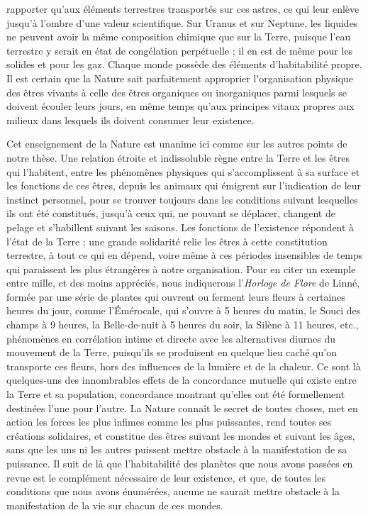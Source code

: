 \documentclass[a4paper, 11pt, oneside]{article}
\begin{document}
rapporter qu'aux éléments terrestres transportés sur ces astres, ce qui leur enlève jusqu'à l'ombre d'une valeur scientifique. Sur Uranus et sur Neptune, les liquides ne peuvent avoir la même composition chimique que sur la Terre, puisque l'eau terrestre y serait en état de congélation perpétuelle ; il en est de même pour les solides et pour les gaz. Chaque monde possède des éléments d'habitabilité propre. Il est certain que la Nature sait parfaitement approprier l'organisation physique des êtres vivants à celle des êtres organiques ou inorganiques parmi lesquels se doivent écouler leurs jours, en même temps qu'aux principes vitaux propres aux milieux dans lesquels ils doivent consumer leur existence.

Cet enseignement de la Nature est unanime ici comme sur les autres points de notre thèse. Une relation étroite et indissoluble règne entre la Terre et les êtres qui l'habitent, entre les phénomènes physiques qui s'accomplissent à sa surface et les fonctions de ces êtres, depuis les animaux qui émigrent sur l'indication de leur instinct personnel, pour se trouver toujours dans les conditions suivant lesquelles ils ont été constitués, jusqu'à ceux qui, ne pouvant se déplacer, changent de pelage et s'habillent suivant les saisons. Les fonctions de l'existence répondent à l'état de la Terre ; une grande solidarité relie les êtres à cette constitution terrestre, à tout ce qui en dépend, voire même à ces périodes insensibles de temps qui paraissent les plus étrangères à notre organisation. Pour en citer un exemple entre mille, et des moins appréciés, nous indiquerons l'\emph{Horloge de Flore} de Linné, formée par une série de plantes qui ouvrent ou ferment leurs fleurs à certaines heures du jour, comme l'Émérocale, qui s'ouvre à 5 heures du matin, le Souci des champs à 9 heures, la Belle-de-nuit à 5 heures du soir, la Silène à 11 heures, etc., phénomènes en corrélation intime et directe avec les alternatives diurnes du mouvement de la Terre, puisqu'ils se produisent en quelque lieu caché qu'on transporte ces fleurs, hors des influences de la lumière et de la chaleur. Ce sont là quelques-uns des innombrables effets de la concordance mutuelle qui existe entre la Terre et sa population, concordance montrant qu'elles ont été formellement destinées l'une pour l'autre. La Nature connaît le secret de toutes choses, met en action les forces les plus infimes comme les plus puissantes, rend toutes ses créations solidaires, et constitue des êtres suivant les mondes et suivant les âges, sans que les uns ni les autres puissent mettre obstacle à la manifestation de sa puissance. Il suit de là que l'habitabilité des planètes que nous avons passées en revue est le complément nécessaire de leur existence, et que, de toutes les conditions que nous avons énumérées, aucune ne saurait mettre obstacle à la manifestation de la vie sur chacun de ces mondes.
\end{document}
